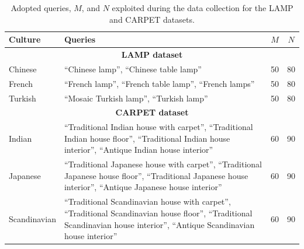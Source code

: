 %
\begin{table}
\footnotesize
\centering
\setlength{\tabcolsep}{0.1cm}
\renewcommand{\arraystretch}{1.5}
\begin{tabular}{l|p{12.5cm}|c|c}
\toprule
\textbf{Culture} &  \textbf{Queries} & $M$ & $N$  \\
\midrule
\multicolumn{4}{c}{\textbf{LAMP dataset}}\\
\midrule
Chinese & ``Chinese lamp'', ``Chinese table lamp'' & 50 & 80  \\
\hline
French &``French lamp'', ``French table lamp'', ``French lamps'' & 50 & 80  \\
\hline
Turkish & ``Mosaic Turkish lamp'', ``Turkish lamp'' & 50 & 80 \\
\midrule
\multicolumn{4}{c}{\textbf{CARPET dataset}}\\
\midrule
Indian & ``Traditional Indian house with carpet'', ``Traditional Indian house floor'', ``Traditional Indian house interior'', ``Antique Indian house interior'' & 60 & 90 \\
\hline
Japanese & ``Traditional Japanese house with carpet'', ``Traditional Japanese house floor'', ``Traditional Japanese house interior'', ``Antique Japanese house interior'' & 60 & 90 \\
\hline
Scandinavian & ``Traditional Scandinavian house with carpet'', ``Traditional Scandinavian house floor'', ``Traditional Scandinavian house interior'', ``Antique Scandinavian house interior'' & 60 & 90 \\
\bottomrule
\end{tabular}
\caption{Adopted queries, $M$, and $N$ exploited during the data collection for the LAMP and CARPET datasets.}
\label{ch2:tab:casestudy:1}
\end{table}
%
